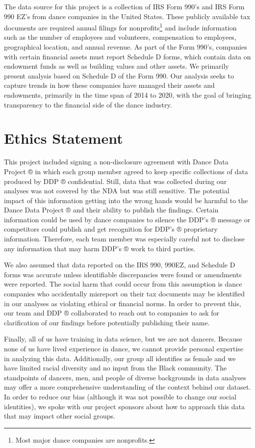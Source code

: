 \documentclass[Dance Data
Project,article,submit,moreauthors,pdftex]{mdpi}
\begin{document}
The data source for this project is a collection of IRS Form 990's and
IRS Form 990 EZ's from dance companies in the United States. These
publicly available tax documents are required annual filings for
nonprofits\footnote{Most major dance companies are nonprofits.} and
include information such as the number of employees and volunteers,
compensation to employees, geographical location, and annual revenue. As
part of the Form 990's, companies with certain financial assets must
report Schedule D forms, which contain data on endowment funds as well
as building values and other assets. We primarily present analysis based
on Schedule D of the Form 990. Our analysis seeks to capture trends in
how these companies have managed their assets and endowments, primarily
in the time span of 2014 to 2020, with the goal of bringing transparency
to the financial side of the dance industry.

\hypertarget{ethics-statement}{%
\section{Ethics Statement}\label{ethics-statement}}

This project included signing a non-disclosure agreement with Dance Data
Project ® in which each group member agreed to keep specific collections
of data produced by DDP ® confidential. Still, data that was collected
during our analyses was not covered by the NDA but was still sensitive.
The potential impact of this information getting into the wrong hands
would be harmful to the Dance Data Project ® and their ability to
publish the findings. Certain information could be used by dance
companies to silence the DDP's ® message or competitors could publish
and get recognition for DDP's ® proprietary information. Therefore, each
team member was especially careful not to disclose any information that
may harm DDP's ® work to third parties.

We also assumed that data reported on the IRS 990, 990EZ, and Schedule D
forms was accurate unless identifiable discrepancies were found or
amendments were reported. The social harm that could occur from this
assumption is dance companies who accidentally misreport on their tax
documents may be identified in our analyses as violating ethical or
financial norms. In order to prevent this, our team and DDP ®
collaborated to reach out to companies to ask for clarification of our
findings before potentially publishing their name.

Finally, all of us have training in data science, but we are not
dancers. Because none of us have lived experience in dance, we cannot
provide personal expertise in analyzing this data. Additionally, our
group all identifies as female and we have limited racial diversity and
no input from the Black community. The standpoints of dancers, men, and
people of diverse backgrounds in data analyses may offer a more
comprehensive understanding of the context behind our dataset. In order
to reduce our bias (although it was not possible to change our social
identities), we spoke with our project sponsors about how to approach
this data that may impact other social groups.
\end{document}
